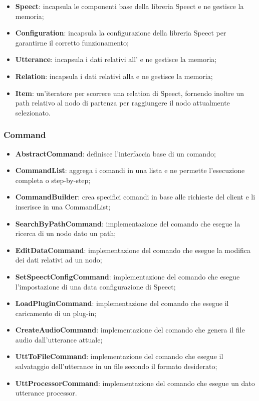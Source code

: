 \documentclass[openany,12pt,a4paper]{report}
\begin{document}
\begin{itemize}
	\item \textbf{Speect}: incapsula le componenti base della libreria Speect e ne gestisce la memoria;
	\item \textbf{Configuration}: incapsula la configurazione della libreria Speect per garantirne il corretto funzionamento;
	\item \textbf{Utterance}: incapsula i dati relativi all' e ne gestisce la memoria;
	\item \textbf{Relation}: incapsula i dati relativi alla  e ne gestisce la memoria;
	\item \textbf{Item}: un'iteratore per scorrere una relation di Speect, fornendo inoltre un path relativo al nodo di partenza per raggiungere il nodo attualmente selezionato. 
\end{itemize}

\subsubsection{Command}

\begin{itemize}
	\item \textbf{AbstractCommand}: definisce l'interfaccia base di un comando;
	\item \textbf{CommandList}: aggrega i comandi in una lista e ne permette l'esecuzione completa o step-by-step;
	\item \textbf{CommandBuilder}: crea specifici comandi in base alle richieste del client e li inserisce in una CommandList;
	\item \textbf{SearchByPathCommand}: implementazione del comando che esegue la ricerca di un nodo dato un path;
	\item \textbf{EditDataCommand}: implementazione del comando che esegue la modifica dei dati relativi ad un nodo;
	\item \textbf{SetSpeectConfigCommand}: implementazione del comando che esegue l'impostazione di una data configurazione di Speect;
	\item \textbf{LoadPluginCommand}: implementazione del comando che esegue il caricamento di un plug-in;
	\item \textbf{CreateAudioCommand}: implementazione del comando che genera il file audio dall'utterance attuale;
	\item \textbf{UttToFileCommand}: implementazione del comando che esegue il salvataggio dell'utterance in un file secondo il formato desiderato;
	\item \textbf{UttProcessorCommand}: implementazione del comando che esegue un dato utterance processor.
\end{itemize}
\end{document}
